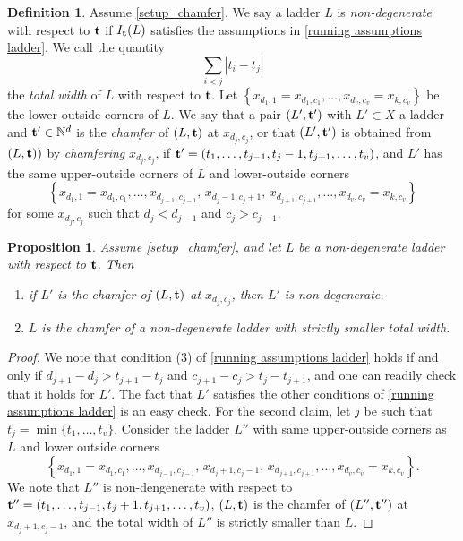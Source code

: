 \documentclass[12pt]{amsart}
\newtheorem{proposition}[proposition]{Proposition}
\theoremstyle{definition}
\newtheorem{definition}[definition]{Definition}
\renewcommand{\(}{\left(}
\renewcommand{\)}{\right)}
\newcommand{\NN}{\mathbb{N} }
\renewcommand{\!}[1]{{\color{red}\text{\Huge$\star$ }#1}}
\newcommand{\ttt}{{\bf t}}
\begin{document}
\begin{definition}\label{def_chamfer}
Assume \autoref{setup_chamfer}. We say a ladder $L$ is {\it non-degenerate} with respect to $\ttt$ if $I_\ttt(L)$ satisfies the assumptions in \autoref{running assumptions ladder}.  %
We call the quantity $$\sum_{i<j}|t_i-t_j|$$
the {\it total width} of $L$ with respect to $\ttt$.   
Let  $\left\{x_{d_1,1}=x_{d_1,c_1},\ldots,x_{d_v,c_v}=x_{k,c_v}\right\}$ be the lower-outside corners of $L$. We say that a pair $(L', \ttt')$ with $L'\subset X$ a ladder and $\ttt'\in \NN^d$  is the {\it chamfer} of $(L,\ttt)$ at $x_{d_j,c_j}$, or that $(L', \ttt')$ is obtained from $(L,\ttt))$ by {\it chamfering} $x_{d_j,c_j}$, if $\ttt'=(t_1,\ldots, t_{j-1}, t_j-1,t_{j+1},\ldots, t_v)$, and $L'$ has the same upper-outside corners of $L$ and lower-outside corners $$\left\{x_{d_1,1}=x_{d_1,c_1},\ldots,x_{d_{j-1},c_{j-1}},\, x_{d_j-1,c_j+1},\, x_{d_{j+1},c_{j+1}},\ldots,x_{d_v,c_v}=x_{k,c_v}\right\}$$ for some  %
$x_{d_j,c_j}$ such that $d_j<d_{j-1}$ and $c_j>c_{j-1}$. 
\end{definition}


\begin{proposition} \label{prop_chamfer}
Assume \autoref{setup_chamfer}, and let $L$ be a non-degenerate ladder with respect to $\ttt$. Then
\begin{enumerate}[{\rm (1)}]
	\item if $L'$ is the chamfer of $(L,\ttt)$ at $x_{d_j,c_j}$, then  $L'$  is non-degenerate.
	\item $L$ is the chamfer of a non-degenerate ladder with strictly smaller total width. 
\end{enumerate}
\end{proposition}
\begin{proof} We note that condition (3) of \autoref{running assumptions ladder} holds if and only if $d_{j+1}-d_j>t_{j+1}-t_j$ and $c_{j+1}-c_j>t_{j}-t_{j+1}$, and one can readily check that it holds for $L'$. The fact that $L'$ satisfies the other conditions of \autoref{running assumptions ladder} is an easy check. For the second claim, let $j$ be such that $t_j=\min\{t_1,\ldots, t_v\}$. Consider the ladder $L''$ with same upper-outside corners as $L$ and lower outside corners $$\left\{x_{d_1,1}=x_{d_1,c_1},\ldots,x_{d_{j-1},c_{j-1}},\, x_{d_j+1,c_j-1},\, x_{d_{j+1},c_{j+1}},\ldots,x_{d_v,c_v}=x_{k,c_v}\right\}.$$
We note that $L''$ is non-dengenerate with respect to $\ttt''=(t_1,\ldots, t_{j-1}, t_j+1,t_{j+1},\ldots, t_v)$, $(L,\ttt)$ is the chamfer of $(L'',\ttt'')$ at $x_{d_j+1,c_j-1}$, and the total width of $L''$ is strictly smaller than $L$.
\end{proof}
\end{document}
